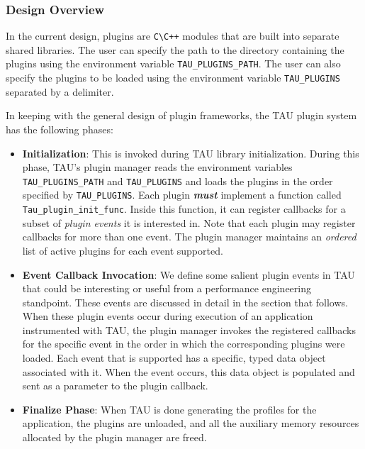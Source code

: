 \subsubsection{Design Overview} In the current design, plugins are \verb+C\+\verb+C+\texttt{++} modules that are built into separate shared libraries. The user can specify the path to the directory containing the plugins using the environment variable \verb+TAU_PLUGINS_PATH+. The user can also specify the plugins to be loaded using the environment variable \verb+TAU_PLUGINS+ separated by a delimiter. 
\par In keeping with the general design of plugin frameworks, the TAU plugin system has the following phases:
\begin {itemize}
\item \textbf{Initialization}: This is invoked during TAU library initialization. During this phase, TAU's plugin manager reads the environment variables \verb+TAU_PLUGINS_PATH+ and \verb+TAU_PLUGINS+ and loads the plugins in the order specified by \verb+TAU_PLUGINS+. Each plugin \textit{\textbf{must}} implement a function called \verb+Tau_plugin_init_func+. Inside this function, it can register callbacks for a subset of \textit{plugin events} it is interested in. Note that each plugin may register callbacks for more than one event. The plugin manager maintains an \textit{ordered} list of active plugins for each event supported.
\item \textbf{Event Callback Invocation}: We define some salient plugin events in TAU that could be interesting or useful from a performance engineering standpoint. These events are discussed in detail in the section that follows. When these plugin events occur during execution of an application instrumented with TAU, the plugin manager invokes the registered callbacks for the specific event in the order in which the corresponding plugins were loaded. Each event that is supported has a specific, typed data object associated with it. When the event occurs, this data object is populated and sent as a parameter to the plugin callback. 
\item \textbf{Finalize Phase}: When TAU is done generating the profiles for the application, the plugins are unloaded, and all the auxiliary memory resources allocated by the plugin manager are freed.
\end{itemize}

